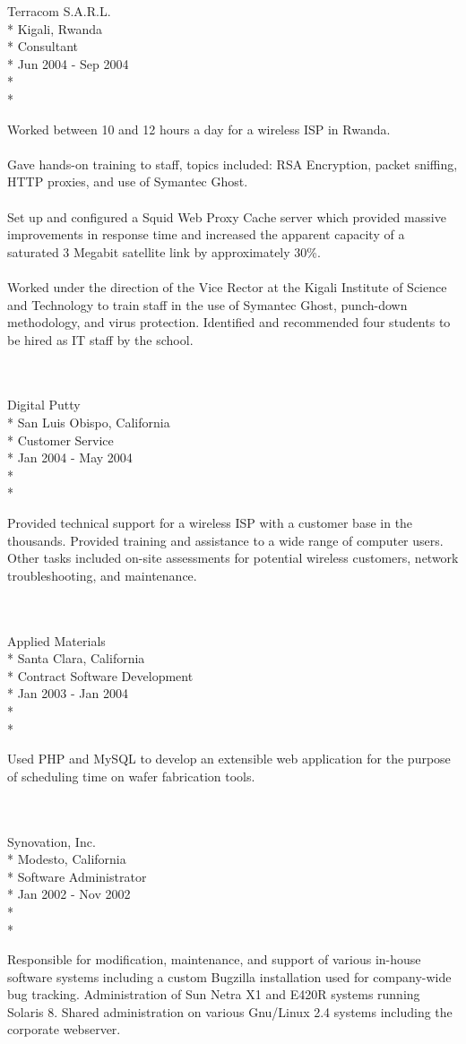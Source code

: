 \documentclass[10pt]{article}
\newcommand{\work}[5]{ 
#1\\*
#3\\*
#4\\*
#2\\*
\\*
\makebox[1.25in][l]{}
\begin{minipage}[t]{5.00in}\small{#5}\end{minipage}
\\
\\
}
\begin{document}
\work{Terracom S.A.R.L.}{Jun 2004 - Sep 2004}{Kigali, Rwanda}{Consultant}{
Worked between 10 and 12 hours a day for a wireless ISP in Rwanda.
\\
\\
Gave hands-on training to staff, topics included: RSA Encryption, packet sniffing, HTTP proxies, and use of Symantec Ghost.
\\
\\
Set up and configured a Squid Web Proxy Cache server which provided massive improvements in response time and increased the apparent capacity of a saturated 3 Megabit satellite link by approximately 30\%.
\\
\\
Worked under the direction of the Vice Rector at the Kigali Institute of Science and Technology to train staff 
in the use of Symantec Ghost, punch-down methodology, and virus protection. 
Identified and recommended four students to be hired as IT staff by the school.
}

\work{Digital Putty}{Jan 2004 - May 2004}{San Luis Obispo, California}{Customer Service}{
Provided technical support for a wireless ISP with a customer base in the thousands. 
Provided training and assistance to a wide range of computer users. 
Other tasks included on-site assessments for potential wireless customers, network troubleshooting, and maintenance.
}

\work{Applied Materials}{Jan 2003 - Jan 2004}{Santa Clara, California}{Contract Software Development}{
Used PHP and MySQL to develop an extensible web application for the purpose of scheduling time on wafer fabrication tools.
}


\work{Synovation, Inc.}{Jan 2002 - Nov 2002}{Modesto, California}{Software Administrator}{
Responsible for modification, maintenance, and support of various in-house software systems 
including a custom Bugzilla installation used for company-wide bug tracking. 
Administration of Sun Netra X1 and E420R systems running Solaris 8. 
Shared administration on various Gnu/Linux 2.4 systems including the corporate webserver.
}
\end{document}
